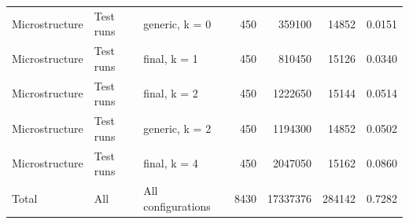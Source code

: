 \begin{table}
\begin{tabular}[t]{lllrrrr}
Microstructure & Test runs & generic, k = 0 & 450 & 359100 & 14852 & 0.0151\\
\addlinespace
Microstructure & Test runs & final, k = 1 & 450 & 810450 & 15126 & 0.0340\\
Microstructure & Test runs & final, k = 2 & 450 & 1222650 & 15144 & 0.0514\\
Microstructure & Test runs & generic, k = 2 & 450 & 1194300 & 14852 & 0.0502\\
Microstructure & Test runs & final, k = 4 & 450 & 2047050 & 15162 & 0.0860\\
Total & All & All configurations & 8430 & 17337376 & 284142 & 0.7282\\
\bottomrule
\end{tabular}
\end{table}

